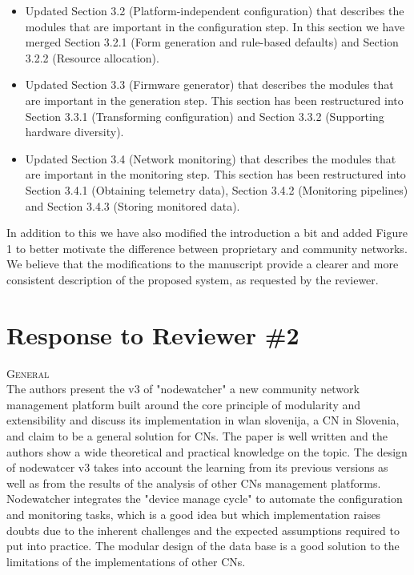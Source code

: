 \documentclass[12pt,twoside,a4paper]{report}
\begin{document}
\begin{itemize}
\item Updated Section 3.2 (Platform-independent configuration) that describes the modules that are important in the configuration step.
In this section we have merged Section 3.2.1 (Form generation and rule-based defaults) and Section 3.2.2 (Resource allocation).
\item Updated Section 3.3 (Firmware generator) that describes the modules that are important in the generation step.
This section has been restructured into Section 3.3.1 (Transforming configuration) and Section 3.3.2 (Supporting hardware diversity).
\item Updated Section 3.4 (Network monitoring) that describes the modules that are important in the monitoring step.
This section has been restructured into Section 3.4.1 (Obtaining telemetry data), Section 3.4.2 (Monitoring pipelines) and Section 3.4.3 (Storing monitored data).
\end{itemize}

In addition to this we have also modified the introduction a bit and added Figure 1 to better motivate the difference between proprietary and community networks. We believe that the modifications to the manuscript provide a clearer and more consistent description of the proposed system, as requested by the reviewer.

\newpage

\section*{Response to Reviewer \#2}

\vspace{0.5cm}\noindent\textsc{General}\\
The authors present the v3 of "nodewatcher" a new community network management platform built around the core principle of modularity and extensibility and discuss its implementation in wlan slovenija, a CN in Slovenia, and claim to be a general solution for CNs. The paper is well written and the authors show a wide theoretical and practical knowledge on the topic. The design of nodewatcer v3 takes into account the learning from its previous versions as well as from the results of the analysis of other CNs management platforms. Nodewatcher integrates the "device manage cycle" to automate the configuration and monitoring tasks, which is a good idea but which implementation raises doubts due to the inherent challenges and the expected assumptions required to put into practice. The modular design of the data base is a good solution to the limitations of the implementations of other CNs.
\end{document}

